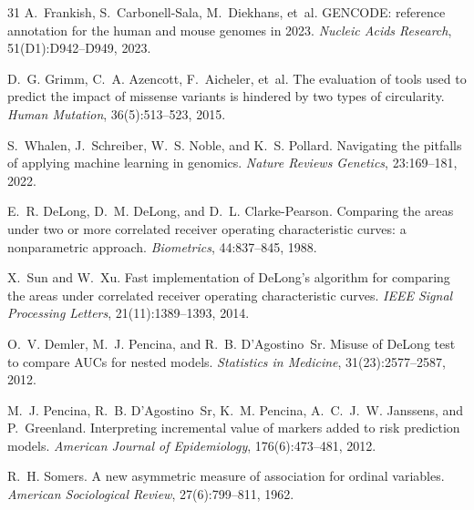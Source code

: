 \begin{thebibliography}{31}
A.~Frankish, S.~Carbonell-Sala, M.~Diekhans, et~al.
\newblock GENCODE: reference annotation for the human and mouse genomes in 2023.
\newblock \emph{Nucleic Acids Research}, 51(D1):D942--D949, 2023.
\newblock {}

D.~G. Grimm, C.~A. Azencott, F.~Aicheler, et~al.
\newblock The evaluation of tools used to predict the impact of missense variants is hindered by
two types of circularity.
\newblock \emph{Human Mutation}, 36(5):513--523, 2015.
\newblock {}

S.~Whalen, J.~Schreiber, W.~S. Noble, and K.~S. Pollard.
\newblock Navigating the pitfalls of applying machine learning in genomics.
\newblock \emph{Nature Reviews Genetics}, 23:169--181, 2022.
\newblock {}

E.~R. DeLong, D.~M. DeLong, and D.~L. Clarke-Pearson.
\newblock Comparing the areas under two or more correlated receiver operating characteristic
curves: a nonparametric approach.
\newblock \emph{Biometrics}, 44:837--845, 1988.
\newblock {}

X.~Sun and W.~Xu.
\newblock Fast implementation of DeLong's algorithm for comparing the areas under correlated
receiver operating characteristic curves.
\newblock \emph{IEEE Signal Processing Letters}, 21(11):1389--1393, 2014.
\newblock {}

O.~V. Demler, M.~J. Pencina, and R.~B. D'Agostino~Sr.
\newblock Misuse of DeLong test to compare AUCs for nested models.
\newblock \emph{Statistics in Medicine}, 31(23):2577--2587, 2012.
\newblock {}

M.~J. Pencina, R.~B. D'Agostino~Sr, K.~M. Pencina, A.~C.~J.~W. Janssens, and P.~Greenland.
\newblock Interpreting incremental value of markers added to risk prediction models.
\newblock \emph{American Journal of Epidemiology}, 176(6):473--481, 2012.
\newblock {}

R.~H. Somers.
\newblock A new asymmetric measure of association for ordinal variables.
\newblock \emph{American Sociological Review}, 27(6):799--811, 1962.
\newblock {}


\end{thebibliography}
